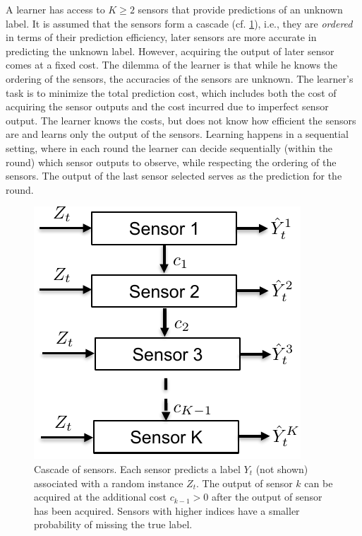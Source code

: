 


A learner has access to $K\geq 2$ sensors that provide predictions
of an unknown label. 
 It is assumed that the sensors form a cascade (cf. \cref{wrap-fig:1}),
i.e., they are  \emph{ordered} in terms of their prediction efficiency,
later sensors are more accurate in predicting the unknown label.
However, acquiring the output of later sensor comes at a fixed cost.
The dilemma of the learner is that while he knows the ordering of the sensors,
the accuracies of the sensors are unknown.
The learner's task is to minimize the total prediction cost, which includes
both the cost of acquiring the sensor outputs and the cost incurred due to imperfect
sensor output.
The learner knows the costs, but does not know how efficient the sensors are
and learns only the output of the sensors.
Learning happens in a sequential setting, where in each round the learner can decide
sequentially (within the round) which sensor outputs to observe,
while respecting the ordering of the sensors.
The output of the last sensor selected serves as the prediction for the round.


\begin{figure}
	\vspace{-.5cm}
	\centering
	\includegraphics[scale=.6]{../Figures/SensorCascade}
	\caption{Cascade of sensors.
	Each sensor predicts a label $Y_t$ (not shown) associated
	with a random instance $Z_t$. The output of sensor $k$
	can be acquired at the additional cost $c_{k-1}>0$ after 
	the output of sensor has been acquired. Sensors with higher indices
	have a smaller probability of missing the true label.
	}\label{wrap-fig:1}
	\vspace{-.5cm}
\end{figure} 


